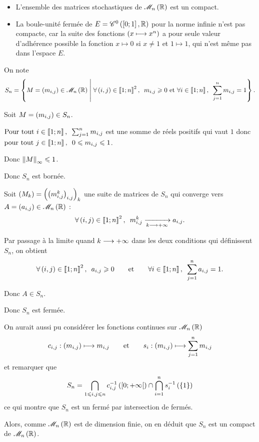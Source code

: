 \begin{ex}
\begin{itemize}
    \item L'ensemble des matrices stochastiques de \(\M{n}[\R]\) est un compact. \\
    \item La boule-unité fermée de \(E=\mathscr{C}^{0}\left(\left[0;1\right],\mathbb{R}\right)\) pour la norme infinie n'est pas compacte, car la suite des fonctions \(\left(x\longmapsto x^n\right)\) a pour seule valeur d'adhérence possible la fonction \(x\mapsto0\) si \(x\not=1\) et \(1\mapsto1\), qui n'est même pas dans l'espace \(E\).
\end{itemize}
\end{ex}

\begin{dem}
On note \[S_n=\accol{M=\paren{m_{i,j}}\in\M{n}[\R]\tq\quantifs{\forall\paren{i,j}\in\interventierii{1}{n}^2}m_{i,j}\geq0\text{ et }\quantifs{\forall i\in\interventierii{1}{n}}\sum_{j=1}^nm_{i,j}=1}.\]

Soit \(M=\left(m_{i,j}\right)\in S_n\).

\(\quantifs{\Tpt i\in\interventierii{1}{n}}\sum_{j=1}^nm_{i,j}\) est une somme de réels positifs qui vaut \(1\) donc \(\quantifs{\tpt j\in\interventierii{1}{n}}0\leq m_{i,j}\leq1\).

Donc \(\norme{M}_\infty\leq1\).

Donc \(S_n\) est bornée.

Soit \(\left(M_k\right)=\left(\left(m_{i,j}^k\right)_{i,j}\right)_k\) une suite de matrices de \(S_n\) qui converge vers \(A=\paren{a_{i,j}}\in\M{n}[\R]\) : \[\quantifs{\forall\paren{i,j}\in\interventierii{1}{n}^2}m_{i,j}^k\tendqd{k\to\pinf}a_{i,j}.\]

Par passage à la limite quand \(k\longrightarrow+\infty\) dans les deux conditions qui définissent \(S_n\), on obtient \[\quantifs{\forall\paren{i,j}\in\interventierii{1}{n}^2}a_{i,j}\geq0\qquad\text{et}\qquad\quantifs{\forall i\in\interventierii{1}{n}}\sum_{j=1}^na_{i,j}=1.\]

Donc \(A\in S_n\).

Donc \(S_n\) est fermée.

On aurait aussi pu considérer les fonctions continues sur \(\M{n}[\R]\) \[c_{i,j}:\left(m_{i,j}\right)\longmapsto m_{i,j}\qquad\text{et}\qquad s_i:\left(m_{i,j}\right)\longmapsto\sum_{j=1}^nm_{i,j}\] et remarquer que \[S_n=\bigcap_{1\leqslant i,j\leqslant n}c_{i,j}^{-1}\left(\left[0;+\infty\right[\right)\cap\bigcap_{i=1}^ns_i^{-1}\left(\left\lbrace1\right\rbrace\right)\] ce qui montre que \(S_n\) est un fermé par intersection de fermés.

Alors, comme \(\M{n}[\R]\) est de dimension finie, on en déduit que \(S_n\) est un compact de \(\M{n}[\R]\).
\end{dem}

